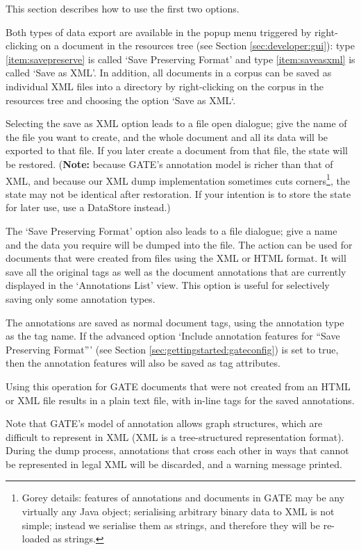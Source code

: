This section describes how to use the first two options.

Both types of data export are available in the popup menu triggered by
right-clicking on a document in the resources tree
(see Section \ref{sec:developer:gui}):
type \ref{item:savepreserve}
is called `Save Preserving Format' and type \ref{item:saveasxml}
is called `Save as XML'. In addition, all documents in a corpus
can be saved as individual XML files into a directory by 
right-clicking on the corpus in the resources tree and choosing
the option `Save as XML`.

Selecting the save as XML option leads to a file open dialogue; give the name
of the file you want to create, and the whole document and all its data will
be exported to that file. If you later create a document from that file, the
state will be restored. ({\bf Note:} because GATE's annotation model is
richer than that of XML, and because our XML dump implementation sometimes
cuts corners\footnote{Gorey details: features of annotations and documents
in GATE may be any virtually any Java object; serialising arbitrary binary
data to XML is not simple; instead we serialise them as strings, and
therefore they will be re-loaded as strings.}, the state may not be identical
after restoration. If your
intention is to store the state for later use, use a DataStore instead.)

The `Save Preserving Format' option also leads to a file dialogue; give a name
and the data you require will be dumped into the file. The action can be used for
documents that were created from files using the XML or HTML format. It will save
all the original tags as well as the document annotations that are currently
displayed in the `Annotations List' view. This option is useful for selectively
saving only some annotation types.

The annotations are saved as normal document tags, using the annotation type as
the tag name. If the advanced option `Include annotation features for ``Save
Preserving Format''' (see Section \ref{sec:gettingstarted:gateconfig}) is set
to true, then the annotation features will also be saved as tag attributes.

Using this operation for GATE documents that were not created from an HTML or XML
file results in a plain text file, with in-line tags for the saved annotations.

Note that GATE's model of annotation allows graph structures, which are difficult
to represent in XML (XML is a tree-structured representation format). During the
dump process, annotations that cross each other in ways that cannot be represented
in legal XML will be discarded, and a warning message printed.

